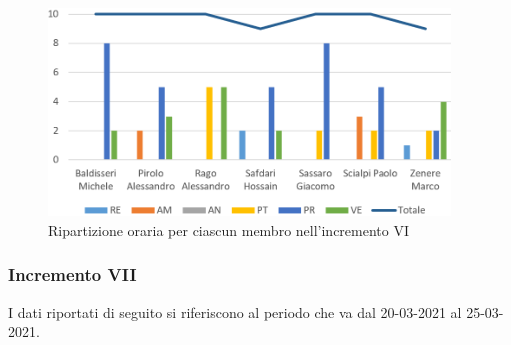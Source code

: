 \begin{figure}[!htb]   
    \centering
    \includegraphics[width=0.95\textwidth]{Images/prev6}
	\caption{Ripartizione oraria per ciascun membro nell'incremento VI}
\end{figure}

\subsubsection{Incremento VII}

I dati riportati di seguito si riferiscono al periodo che va dal 20-03-2021 al 25-03-2021.

